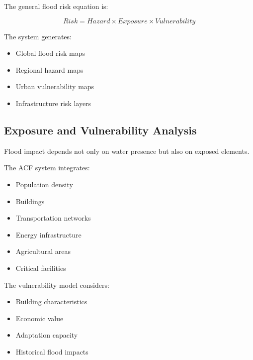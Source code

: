 The general flood risk equation is:

\[
Risk = Hazard \times Exposure \times Vulnerability
\]


The system generates:

\begin{itemize}

\item Global flood risk maps

\item Regional hazard maps

\item Urban vulnerability maps

\item Infrastructure risk layers

\end{itemize}



\subsection{Exposure and Vulnerability Analysis}

Flood impact depends not only on water presence but also on exposed
elements.

The ACF system integrates:

\begin{itemize}

\item Population density

\item Buildings

\item Transportation networks

\item Energy infrastructure

\item Agricultural areas

\item Critical facilities

\end{itemize}


The vulnerability model considers:

\begin{itemize}

\item Building characteristics

\item Economic value

\item Adaptation capacity

\item Historical flood impacts

\end{itemize}


